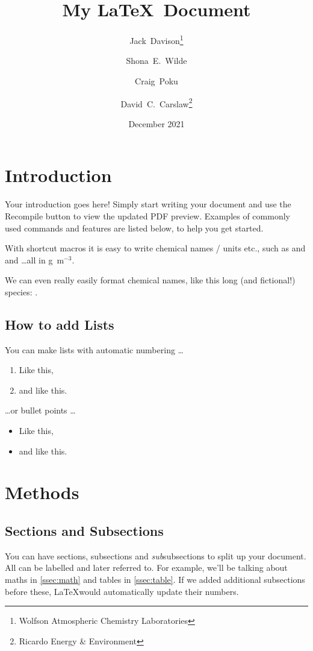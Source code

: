 \documentclass[a4paper]{article}
\title{My \LaTeX~Document}
\author{Jack~Davison\thanks{Wolfson Atmospheric Chemistry Laboratories} \and Shona~E.~Wilde\footnotemark[1] \and Craig~Poku\footnotemark[1] \and David~C.~Carslaw\footnotemark[1]\thanks{Ricardo Energy \& Environment}}
\date{December 2021}
\newcommand{\nox}{\ce{NO_x}\xspace}
\newcommand{\pmtwo}{\ce{PM_{2.5}}\xspace}
\newcommand{\nhthree}{\ce{NH_3}\xspace}
\newcommand{\ug}{\textmu g~m$^{-3}$\xspace}
\begin{document}
\maketitle

\tableofcontents

\newpage

\section{Introduction}

Your introduction goes here! Simply start writing your document and use the Recompile button to view the updated PDF preview. Examples of commonly used commands and features are listed below, to help you get started.

With shortcut macros it is easy to write chemical names / units etc., such as \nox and \pmtwo and \nhthree \ldots all in \ug.

We can even really easily format chemical names, like this long (and fictional!) species: .

\subsection{How to add Lists}

You can make lists with automatic numbering \dots

\begin{enumerate}
\item Like this,
\item and like this.
\end{enumerate}
\dots or bullet points \dots
\begin{itemize}
\item Like this,
\item and like this.
\end{itemize}

\section{Methods}

\subsection{Sections and Subsections}

You can have sections, subsections and \textit{sub}subsections to split up your document. All can be labelled and later referred to. For example, we'll be talking about maths in \autoref{ssec:math} and tables in \autoref{ssec:table}. If we added additional subsections before these, \LaTeX would automatically update their numbers. 
\end{document}
